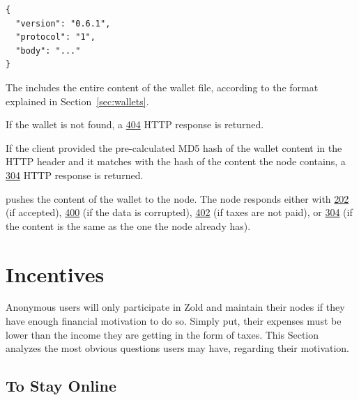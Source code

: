 \documentclass{main}
\begin{document}
\begin{verbatim}
{
  "version": "0.6.1",
  "protocol": "1",
  "body": "..."
}\end{verbatim}

The  includes the entire content of the wallet file, according
to the format explained in Section~\ref{sec:wallets}.

If the wallet is not found, a
\href{https://www.w3.org/Protocols/rfc2616/rfc2616-sec10.html#sec10.4.5}{404}
HTTP response is returned.

If the client provided the pre-calculated MD5 hash of the wallet content in the
\href{https://www.w3.org/Protocols/rfc2616/rfc2616-sec14.html#sec14.26}{}
HTTP header and it matches with the hash of the
content the node contains, a
\href{https://www.w3.org/Protocols/rfc2616/rfc2616-sec10.html#sec10.3.5}{304} HTTP response is returned.

 pushes the content of the wallet to the node. The
node responds either with
\href{https://www.w3.org/Protocols/rfc2616/rfc2616-sec10.html#sec10.2.3}{202} (if accepted),
\href{https://www.w3.org/Protocols/rfc2616/rfc2616-sec10.html#sec10.4.1}{400} (if the data is corrupted),
\href{https://www.w3.org/Protocols/rfc2616/rfc2616-sec10.html#sec10.4.3}{402} (if taxes are not paid),
or
\href{https://www.w3.org/Protocols/rfc2616/rfc2616-sec10.html#sec10.3.5}{304}
(if the content is the same as the one the node already has).

\section{Incentives}\label{sec:incentives}

Anonymous users will only participate in Zold and maintain
their nodes if they have enough financial motivation to do so. Simply
put, their expenses must be lower than the income they are getting in
the form of taxes. This Section analyzes the most obvious questions users
may have, regarding their motivation.

\subsection{To Stay Online}
\end{document}
